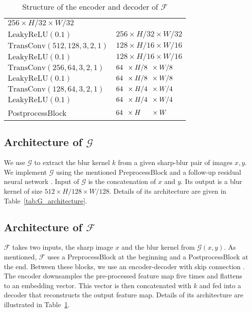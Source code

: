 \documentclass[final]{cvpr}
\newcommand{\Tref}[1]{Table~\ref{#1}}
\begin{document}
\begin{table}[ht]
\begin{tabular}{l|l}
        $256 \times H/32 \times W/32$\\
        $\text{LeakyReLU}(0.1)$                      &  
        $256 \times H/32 \times W/32$\\
        $\text{TransConv}(512, 128, 3, 2, 1)$        &  
        $128 \times H/16 \times W/16$\\
        $\text{LeakyReLU}(0.1)$                      &  
        $128 \times H/16 \times W/16$\\
        $\text{TransConv}(256, 64, 3, 2, 1)$         &  
        $64\hphantom{0} \times H/8\hphantom{0} \times W/8$\\
        $\text{LeakyReLU}(0.1)$                      &  
        $64\hphantom{0} \times H/8\hphantom{0} \times W/8$\\
        $\text{TransConv}(128, 64, 3, 2, 1)$         &  
        $64\hphantom{0} \times H/4\hphantom{0} \times W/4$\\
        $\text{LeakyReLU}(0.1)$                      &  
        $64\hphantom{0} \times H/4\hphantom{0} \times W/4$\\
        PostprocessBlock & $64\hphantom{0} \times H\hphantom{000} \times W\hphantom{00}$\\
        
        \bottomrule
    \end{tabular}
    \caption{Structure of the encoder and decoder of $\mathcal{F}$}
    \label{tab:F_architecture}
\end{table}

\subsection{Architecture of $\mathcal{G}$}
We use $\mathcal{G}$ to extract the blur kernel $k$ from a given sharp-blur pair of images $x, y$. We implement $\mathcal{G}$ using the mentioned PreprocessBlock and a follow-up residual neural network \cite{he2016deep}. Input of $\mathcal{G}$ is the concatenation of $x$ and $y$. Its output is a blur kernel of size $512 \times H/128 \times W/128$. Details of its architecture are given in \Tref{tab:G_architecture}.

\subsection{Architecture of $\mathcal{F}$}
$\mathcal{F}$ takes two inputs, the sharp image $x$ and the blur kernel from $\mathcal{G}(x, y)$. As mentioned, $\mathcal{F}$ uses a PreprocessBlock at the beginning and a PostprocessBlock at the end. Between these blocks, we use an encoder-decoder with skip connection \cite{ronneberger2015u}. The encoder downsamples the pre-processed feature map five times and flattens to an embedding vector. This vector is then concatenated with $k$ and fed into a decoder that reconstructs the output feature map. Details of its architecture are illustrated in \Tref{tab:F_architecture}.
\end{document}
